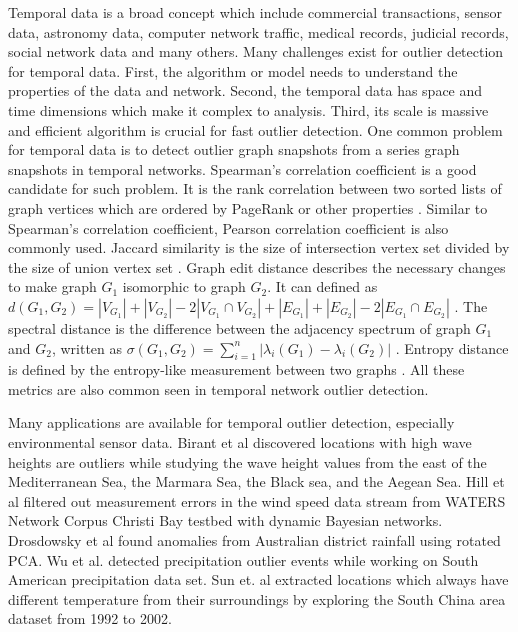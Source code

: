 \documentclass[letterpaper, 10 pt, conference]{ieeeconf}  %
\begin{document}
Temporal data is a broad concept which include commercial transactions, sensor data, astronomy data, computer network traffic, medical records, judicial records, social network data and many others. Many challenges exist for outlier detection for temporal data. First, the algorithm or model needs to understand the properties of the data and network. Second, the temporal data has space and time dimensions which make it complex to analysis. Third, its scale is massive and efficient algorithm is crucial for fast outlier detection. One common problem for temporal data is to detect outlier graph snapshots from a series graph snapshots in temporal networks. Spearman’s correlation coefficient is a good candidate for such problem. It is the rank correlation between two sorted lists of graph vertices which are ordered by PageRank or other properties \cite{papadimitriou2010web}. Similar to Spearman’s correlation coefficient, Pearson correlation coefficient is also commonly used. Jaccard similarity is the size of intersection vertex set divided by the size of union vertex set \cite{jay2012systematic}. Graph edit distance describes the necessary changes to make graph $G_1$ isomorphic to graph $G_2$. It can defined as $d(G_1, G_2) = |V_{G_1}| + |V_{G_2}| - 2|V_{G_1} \cap V_{G_2}| + |E_{G_1}| + |E_{G_2}| - 2|E_{G_1} \cap E_{G_2}|$ \cite{papadimitriou2010web}. The spectral distance is the difference between the adjacency spectrum of graph $G_1$ and $G_2$, written as $\sigma(G_1, G_2) = \displaystyle\sum_{i=1}^{n}|\lambda_i(G_1) - \lambda_i(G_2)|$ \cite{jovanovic2012spectral}. Entropy distance is defined by the entropy-like measurement between two graphs \cite{pincombe2005anomaly}. All these metrics are also common seen in temporal network outlier detection.

Many applications are available for temporal outlier detection, especially environmental sensor data. Birant et al \cite{kut2006spatio} discovered locations with high wave heights are outliers while studying the wave height values from the east of the Mediterranean Sea, the Marmara Sea, the Black sea, and the Aegean Sea. Hill et al \cite{hill2007real, hill2010anomaly} filtered out measurement errors in the wind speed data stream from WATERS Network Corpus Christi Bay testbed with dynamic Bayesian networks. Drosdowsky et al \cite{drosdowsky1993analysis} found anomalies from Australian district rainfall using rotated PCA. Wu et al. \cite{wu2010spatio} detected precipitation outlier events while working on South American precipitation data set. Sun et. al \cite{yuxiang2005detecting} extracted locations which always have different temperature from their surroundings by exploring the South China area dataset from 1992 to 2002.
\end{document}
